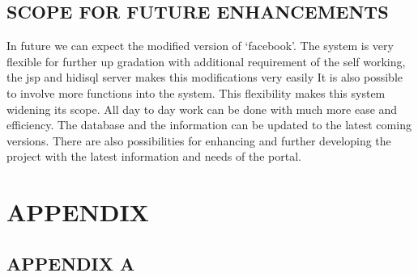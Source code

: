 \documentclass[a4paper,12pt]{article}
\begin{document}
\subsection{SCOPE FOR FUTURE ENHANCEMENTS}  
\hspace{5mm} 
In future we can expect the modified version of ‘facebook’. The system is very flexible for further up gradation with additional requirement of the self working, the jsp  and hidisql server makes this modifications very easily It is also possible to involve more functions into the system. This flexibility makes this system widening its scope. All day to day work can be done with much more ease and efficiency.
The database and the information can be updated to the latest coming versions. There are also possibilities for enhancing and further developing the project with the latest information and needs of the portal.
\newpage
\section{APPENDIX}  
\hspace{5mm} 
\subsection{APPENDIX A} 
\end{document}
